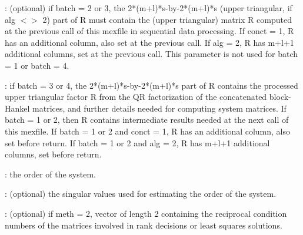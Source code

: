 \begin{parameters}
\begin{varlist}
    : (optional) if batch = 2 or 3, the 2*(m+l)*s-by-2*(m+l)*s (upper
    triangular, if alg $<$$>$
    2) part of R must contain the (upper triangular) matrix R computed at the
    previous call of this mexfile in sequential data processing. If conct = 1, R
    has an additional column, also set at the previous call.  If alg = 2, R has
    m+l+1 additional columns, set at the previous call.  This parameter is not
    used for batch = 1 or batch = 4.

    : if batch = 3 or 4, the 2*(m+l)*s-by-2*(m+l)*s part of R contains
    the processed upper triangular factor R from the QR factorization of the
    concatenated block-Hankel matrices, and further details needed for computing
    system matrices. If batch = 1 or 2, then R contains intermediate results
    needed at the next call of this mexfile. If batch = 1 or 2 and conct = 1, R
    has an additional column, also set before return. If batch = 1 or 2 and alg
    = 2, R has m+l+1 additional columns, set before return.

    : the order of the system.

    : (optional) the singular values used for estimating the order of the system.

    : (optional) if meth = 2, vector of length 2 containing the
    reciprocal condition numbers of the matrices involved in rank decisions or
    least squares solutions.

\end{varlist}
\end{parameters}
